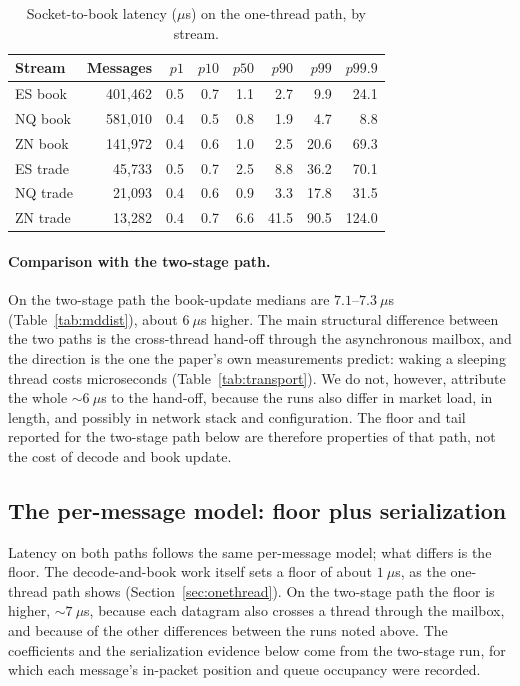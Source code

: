 \documentclass[11pt]{article}
\begin{document}
\begin{table}[!htb]
\centering
\caption{Socket-to-book latency ($\mu$s) on the one-thread path, by stream.}
\label{tab:onethread}
\small
\begin{tabular}{lrrrrrrr}
\toprule
Stream & Messages & $p1$ & $p10$ & $p50$ & $p90$ & $p99$ & $p99.9$ \\
\midrule
ES book  & 401{,}462 & 0.5 & 0.7 & 1.1 & 2.7 & 9.9 & 24.1 \\
NQ book  & 581{,}010 & 0.4 & 0.5 & 0.8 & 1.9 & 4.7 & 8.8 \\
ZN book  & 141{,}972 & 0.4 & 0.6 & 1.0 & 2.5 & 20.6 & 69.3 \\
ES trade & 45{,}733 & 0.5 & 0.7 & 2.5 & 8.8 & 36.2 & 70.1 \\
NQ trade & 21{,}093 & 0.4 & 0.6 & 0.9 & 3.3 & 17.8 & 31.5 \\
ZN trade & 13{,}282 & 0.4 & 0.7 & 6.6 & 41.5 & 90.5 & 124.0 \\
\bottomrule
\end{tabular}
\end{table}

\paragraph{Comparison with the two-stage path.} On the two-stage path the
book-update medians are $7.1$--$7.3~\mu$s (Table~\ref{tab:mddist}), about
$6~\mu$s higher. The main structural difference between the two paths is the
cross-thread hand-off through the asynchronous mailbox, and the direction is the
one the paper's own measurements predict: waking a sleeping thread costs
microseconds (Table~\ref{tab:transport}). We do not, however, attribute the
whole $\sim\!6~\mu$s to the hand-off, because the runs also differ in market
load, in length, and possibly in network stack and configuration. The floor and
tail reported for the two-stage path below are therefore properties of that
path, not the cost of decode and book update.

\subsection{The per-message model: floor plus serialization}
\label{sec:floorslope}

Latency on both paths follows the same per-message model; what differs is the
floor. The decode-and-book work itself sets a floor of about $1~\mu$s, as the
one-thread path shows (Section~\ref{sec:onethread}). On the two-stage path the
floor is higher, $\sim\!7~\mu$s, because each datagram also crosses a thread
through the mailbox, and because of the other differences between the runs noted
above. The coefficients and the serialization evidence below come from the
two-stage run, for which each message's in-packet position and queue occupancy
were recorded.
\end{document}
